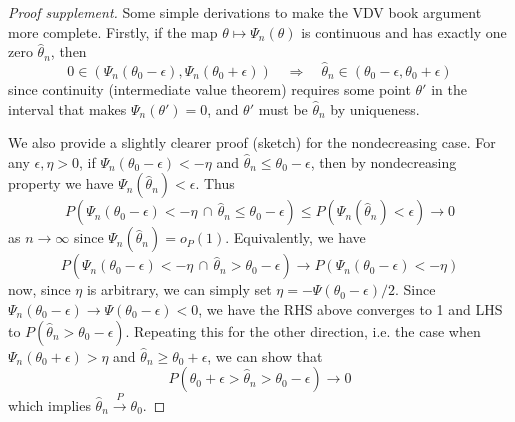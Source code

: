 \documentclass{article}
\begin{document}
\begin{proof}[Proof supplement]
    Some simple derivations to make the VDV book argument more complete.
    Firstly, if the map $\theta \mapsto \Psi_n(\theta)$ is continuous and has exactly one zero $\hat{\theta}_n$, then
    \begin{equation}
        0 \in (\Psi_n(\theta_0  - \epsilon), \Psi_n(\theta_0 + \epsilon)) \quad \Longrightarrow \quad \hat{\theta}_n \in (\theta_0  - \epsilon, \theta_0  + \epsilon)
    \end{equation}
    since continuity (intermediate value theorem) requires some point $\theta'$ in the interval that makes $\Psi_n(\theta') = 0$, and $\theta'$ must be $\hat{\theta}_n$ by uniqueness. 

    We also provide a slightly clearer proof (sketch) for the nondecreasing case. For any $\epsilon, \eta > 0$, if $\Psi_n(\theta_0 - \epsilon) < -\eta$ and $\hat{\theta}_n \leq \theta_0 - \epsilon$, then by nondecreasing property we have $\Psi_n(\hat{\theta}_n) < \epsilon$. Thus
    \begin{equation}
        P\left( \Psi_n(\theta_0 - \epsilon) < -\eta \,\cap\, \hat{\theta}_n \leq \theta_0 - \epsilon \right) \leq P\left( \Psi_n(\hat{\theta}_n) < \epsilon \right) \to 0
    \end{equation}
    as $n \to \infty$ since $\Psi_n(\hat{\theta}_n) = o_P(1)$. Equivalently, we have
    \begin{equation}
        P\left( \Psi_n(\theta_0 - \epsilon) < -\eta \,\cap\, \hat{\theta}_n > \theta_0 - \epsilon \right) \to P\left( \Psi_n(\theta_0 - \epsilon) < -\eta \right)
    \end{equation}
    now, since $\eta$ is arbitrary, we can simply set $\eta = -\Psi(\theta_0 - \epsilon) / 2$. Since $\Psi_n(\theta_0 - \epsilon) \to \Psi(\theta_0 - \epsilon) < 0$, we have the RHS above converges to 1 and LHS to $P( \hat{\theta}_n > \theta_0 - \epsilon)$. Repeating this for the other direction, i.e. the case when $\Psi_n(\theta_0 + \epsilon) > \eta$ and $\hat{\theta}_n \geq \theta_0 + \epsilon$, we can show that
    \begin{equation}
        P\left( \theta_0 + \epsilon > \hat{\theta}_n  > \theta_0 - \epsilon \right) \to 0
    \end{equation}
    which implies $\hat{\theta}_n \overset{P}{\rightarrow} \theta_0$.
\end{proof}
\end{document}
